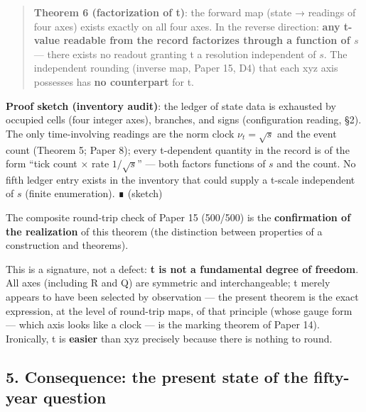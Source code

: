 \documentclass[
]{article}
\begin{document}
\begin{quote}
\textbf{Theorem 6 (factorization of t)}: the forward map (state →
readings of four axes) exists exactly on all four axes. In the reverse
direction: \textbf{any t-value readable from the record factorizes
through a function of \(s\)} --- there exists no readout granting t a
resolution independent of \(s\). The independent rounding (inverse map,
Paper 15, D4) that each xyz axis possesses has \textbf{no counterpart}
for t.
\end{quote}

\textbf{Proof sketch (inventory audit)}: the ledger of state data is
exhausted by occupied cells (four integer axes), branches, and signs
(configuration reading, §2). The only time-involving readings are the
norm clock \(\nu_t=\sqrt{s}\) and the event count (Theorem 5; Paper 8);
every t-dependent quantity in the record is of the form ``tick count ×
rate \(1/\sqrt{s}\)'' --- both factors functions of \(s\) and the count.
No fifth ledger entry exists in the inventory that could supply a
t-scale independent of \(s\) (finite enumeration). ∎ (sketch)

The composite round-trip check of Paper 15 (500/500) is the
\textbf{confirmation of the realization} of this theorem (the
distinction between properties of a construction and theorems).

This is a signature, not a defect: \textbf{t is not a fundamental degree
of freedom}. All axes (including R and Q) are symmetric and
interchangeable; t merely appears to have been selected by observation
--- the present theorem is the exact expression, at the level of
round-trip maps, of that principle (whose gauge form --- which axis
looks like a clock --- is the marking theorem of Paper 14). Ironically,
t is \textbf{easier} than xyz precisely because there is nothing to
round.

\subsection{5. Consequence: the present state of the fifty-year
question}\label{consequence-the-present-state-of-the-fifty-year-question}
\end{document}
